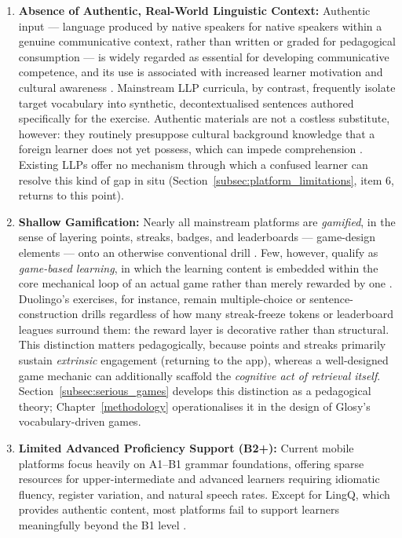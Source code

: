 \begin{enumerate}
        \item \textbf{Absence of Authentic, Real-World Linguistic Context:} Authentic input --- language produced by native speakers for native speakers within a genuine communicative context, rather than written or graded for pedagogical consumption --- is widely regarded as essential for developing communicative competence, and its use is associated with increased learner motivation and cultural awareness \cite{Gilmore_2007}. Mainstream LLP curricula, by contrast, frequently isolate target vocabulary into synthetic, decontextualised sentences authored specifically for the exercise. Authentic materials are not a costless substitute, however: they routinely presuppose cultural background knowledge that a foreign learner does not yet possess, which can impede comprehension \cite{LiuDong2024AuthenticLanguageModelsClassrooms}. Existing LLPs offer no mechanism through which a confused learner can resolve this kind of gap in situ (Section~\ref{subsec:platform_limitations}, item 6, returns to this point).

        \item \textbf{Shallow Gamification:} Nearly all mainstream platforms are \emph{gamified}, in the sense of layering points, streaks, badges, and leaderboards --- game-design elements --- onto an otherwise conventional drill \cite{deterding2011gamification}. Few, however, qualify as \emph{game-based learning}, in which the learning content is embedded within the core mechanical loop of an actual game rather than merely rewarded by one \cite{plass2015foundations}. Duolingo's exercises, for instance, remain multiple-choice or sentence-construction drills regardless of how many streak-freeze tokens or leaderboard leagues surround them: the reward layer is decorative rather than structural. This distinction matters pedagogically, because points and streaks primarily sustain \emph{extrinsic} engagement (returning to the app), whereas a well-designed game mechanic can additionally scaffold the \emph{cognitive act of retrieval itself}. Section~\ref{subsec:serious_games} develops this distinction as a pedagogical theory; Chapter~\ref{methodology} operationalises it in the design of Glosy's vocabulary-driven games.

        \item \textbf{Limited Advanced Proficiency Support (B2+):} Current mobile platforms focus heavily on A1--B1 grammar foundations, offering sparse resources for upper-intermediate and advanced learners requiring idiomatic fluency, register variation, and natural speech rates. Except for LingQ, which provides authentic content, most platforms fail to support learners meaningfully beyond the B1 level \cite{karasimos2022battle}.


\end{enumerate}
